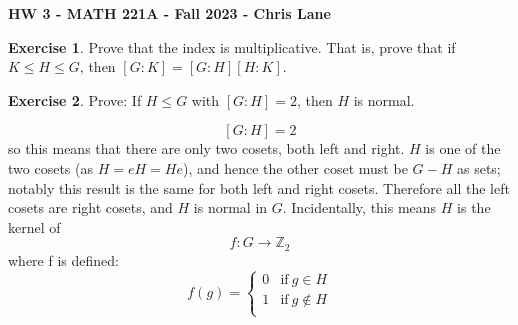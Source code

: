 \documentclass[11pt,oneside]{article}
\numberwithin{equation}{section}
\theoremstyle{definition}
\newtheorem{exercise}{Exercise}
\def\ZZ{\mathbb{Z}}
\begin{document}
\textbf{HW 3 - MATH 221A - Fall 2023 - Chris Lane}

%   
\begin{exercise}
  Prove that the index is multiplicative. That is, prove that if $K \leq H \leq G$, then $[G:K] = [G:H][H:K]$. 
\end{exercise}
\begin{solution}
\end{solution}

\begin{exercise}
  Prove: If $H \leq G$ with $ [G:H] = 2$, then $H$ is normal. 
\end{exercise}
\begin{solution}
  $$ [G:H] = 2$$ so this means that there are only two cosets, both
  left and right.  $H$ is one of the two cosets (as $H = eH = He$),
  and hence the other coset must be $G - H$ as sets; notably this
  result is the same for both left and right cosets.  Therefore all
  the left cosets are right cosets, and $H$ is normal in $G$.
  Incidentally, this means $H$ is the kernel of
  $$
  f: G \to \ZZ_2
  $$
  where f is defined:
  $$
  f(g) = \begin{cases}
    0 & \text{if} \ g \in H  \\
    1 & \text{if} \ g \notin H \\
  \end{cases}
  $$
\end{solution}
\end{document}

